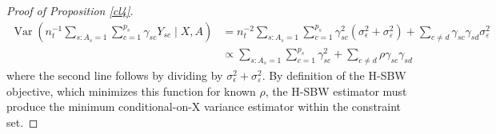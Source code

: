 \begin{proof}[Proof of Proposition \ref{cl4}]
\begin{align*}
    \operatorname{Var}\left( n_t^{-1}\sum_{s: A_s = 1}\sum_{c = 1}^{p_s}\gamma_{sc}Y_{sc} \mid X, A\right) &= n_t^{-2}\sum_{s: A_s = 1}\sum_{c = 1}^{p_s}\gamma_{sc}^2(\sigma^2_{\epsilon} + \sigma^2_{\varepsilon}) + \sum_{c \ne d}\gamma_{sc}\gamma_{sd}\sigma^2_{\varepsilon} \\
    &\propto \sum_{s: A_s = 1}\sum_{c = 1}^{p_s}\gamma_{sc}^2 + \sum_{c \ne d}\rho \gamma_{sc}\gamma_{sd}
\end{align*}
%
where the second line follows by dividing by $\sigma^2_{\epsilon} + \sigma^2_{\varepsilon}$. By definition of the H-SBW objective, which minimizes this function for known $\rho$, the H-SBW estimator must produce the minimum conditional-on-X variance estimator within the constraint set.
\end{proof}


